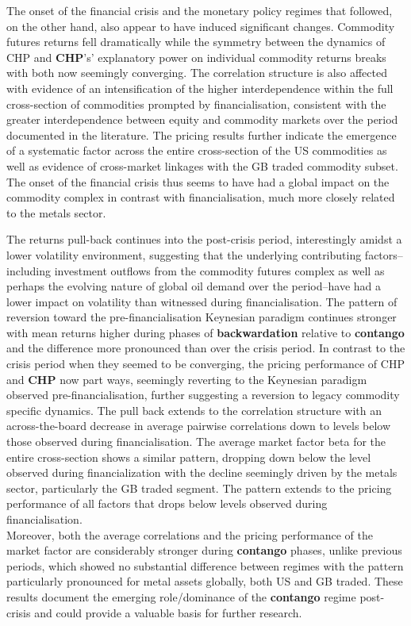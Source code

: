 \documentclass[
  authoryear,
  preprint,
  3p]{elsarticle}
\begin{document}
\bigskip

The onset of the financial crisis and the monetary policy regimes that
followed, on the other hand, also appear to have induced significant
changes. Commodity futures returns fell dramatically while the symmetry
between the dynamics of CHP and \textbf{CHP}'s' explanatory power on
individual commodity returns breaks with both now seemingly converging.
The correlation structure is also affected with evidence of an
intensification of the higher interdependence within the full
cross-section of commodities prompted by financialisation, consistent
with the greater interdependence between equity and commodity markets
over the period documented in the literature. The pricing results
further indicate the emergence of a systematic factor across the entire
cross-section of the US commodities as well as evidence of cross-market
linkages with the GB traded commodity subset. The onset of the financial
crisis thus seems to have had a global impact on the commodity complex
in contrast with financialisation, much more closely related to the
metals sector.

\medskip

The returns pull-back continues into the post-crisis period,
interestingly amidst a lower volatility environment, suggesting that the
underlying contributing factors--including investment outflows from the
commodity futures complex as well as perhaps the evolving nature of
global oil demand over the period--have had a lower impact on volatility
than witnessed during financialisation. The pattern of reversion toward
the pre-financialisation Keynesian paradigm continues stronger with mean
returns higher during phases of \textbf{backwardation} relative to
\textbf{contango} and the difference more pronounced than over the
crisis period. In contrast to the crisis period when they seemed to be
converging, the pricing performance of CHP and \textbf{CHP} now part
ways, seemingly reverting to the Keynesian paradigm observed
pre-financialisation, further suggesting a reversion to legacy commodity
specific dynamics. The pull back extends to the correlation structure
with an across-the-board decrease in average pairwise correlations down
to levels below those observed during financialisation. The average
market factor beta for the entire cross-section shows a similar pattern,
dropping down below the level observed during financialization with the
decline seemingly driven by the metals sector, particularly the GB
traded segment. The pattern extends to the pricing performance of all
factors that drops below levels observed during financialisation.\\
Moreover, both the average correlations and the pricing performance of
the market factor are considerably stronger during \textbf{contango}
phases, unlike previous periods, which showed no substantial difference
between regimes with the pattern particularly pronounced for metal
assets globally, both US and GB traded. These results document the
emerging role/dominance of the \textbf{contango} regime post-crisis and
could provide a valuable basis for further research.
\end{document}
